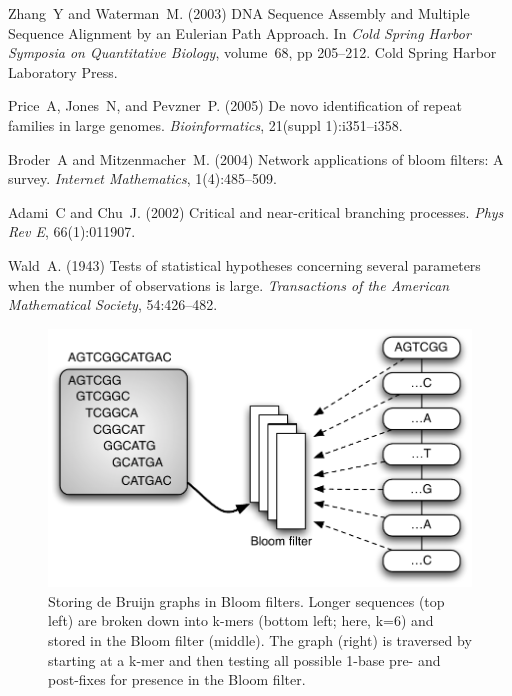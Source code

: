 \documentclass{pnastwo}
\begin{document}
\begin{article}
\begin{thebibliography}{10}
 Zhang~Y and Waterman~M. (2003) DNA Sequence Assembly 
and Multiple Sequence Alignment by an Eulerian Path Approach. In {\it Cold 
Spring Harbor Symposia on Quantitative Biology}, volume~68, pp 205--212. 
Cold Spring Harbor Laboratory Press.

 Price~A, Jones~N, and Pevzner~P. (2005) De novo 
identification of repeat families in large genomes. {\it Bioinformatics}, 
21(suppl 1):i351--i358.

Broder~A and Mitzenmacher~M. (2004) Network applications of bloom filters: 
A survey. {\it Internet Mathematics}, 1(4):485--509.

 Adami~C and Chu~J. (2002) Critical and 
near-critical branching processes. {\it Phys Rev E}, 66(1):011907.

 Wald~A. (1943) Tests of statistical hypotheses concerning 
several parameters when the number of observations is large. {\it Transactions 
of the American Mathematical Society}, 54:426--482.

\end{thebibliography}

\end{article}

\begin{figure}
\centering
\includegraphics[width=5in]{bloomgraph}
\caption{Storing de Bruijn graphs in Bloom filters.  Longer sequences (top left) are broken down into k-mers (bottom left; here, k=6) and stored in the Bloom filter (middle).
The graph (right) is traversed by starting at a k-mer and then testing all possible 1-base pre- and post-fixes for presence in the Bloom filter.}

\label{fig:bloomgraph}
\end{figure}
\end{document}
